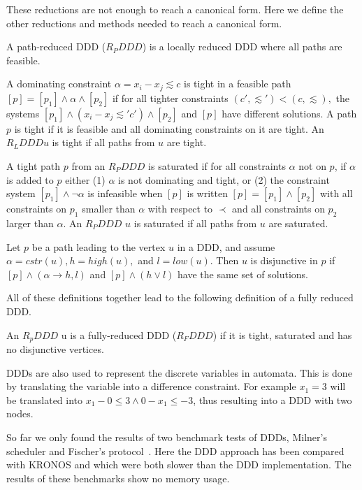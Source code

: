 These reductions are not enough to reach a canonical form. Here we define the other reductions and methods needed to reach a canonical form.

\begin{mydef}
A path-reduced DDD ($R_PDDD$) is a locally reduced DDD where all paths are feasible.
\end{mydef}

\begin{mydef}
A dominating constraint $\alpha = x_i - x_j \lesssim c$ is tight in a feasible path $[p] = [p_1] \wedge \alpha \wedge [p_2]$ if for all tighter constraints $(c', \lesssim') < (c,\lesssim),$ the systems $[p_1] \wedge (x_i - x_j \lesssim' c') \wedge [p_2]$ and $[p]$ have different solutions. A path $p$ is tight if it is feasible and all dominating constraints on it are tight. An $R_LDDD u$ is tight if all paths from $u$ are tight. 
\end{mydef}

\begin{mydef}
A tight path $p$ from an $R_PDDD$ is saturated if for all constraints $\alpha$ not on $p$, if $\alpha$ is added to $p$ either (1) $\alpha$ is not dominating and tight, or (2) the constraint system $[p_1] \wedge \neg\alpha$ is infeasible when $[p]$ is written $[p] = [p_1] \wedge [p_2]$ with all constraints on $p_1$ smaller than $\alpha$ with respect to $\prec$ and all constraints on $p_2$ larger than $\alpha$. An $R_PDDD$ $u$ is saturated if all paths from $u$ are saturated.
\end{mydef}

\begin{mydef}
Let $p$ be a path leading to the vertex $u$ in a DDD, and assume $\alpha = cstr(u), h = high(u),$ and $l = low(u)$. Then $u$ is disjunctive in $p$ if $[p] \wedge (\alpha \rightarrow h,l)$ and $[p] \wedge (h \vee l)$ have the same set of solutions.
\end{mydef}

All of these definitions together lead to the following definition of a fully reduced DDD.
% 
\begin{mydef}
\label{def:RFDDD}
An $R_pDDD$ u is a fully-reduced DDD ($R_FDDD$) if it is tight, saturated and has no disjunctive vertices.
\end{mydef}

DDDs are also used to represent the discrete variables in automata. This is done by translating the variable into a difference constraint. For example $x_1 = 3$ will be translated into $x_1 - 0 \leq 3 \wedge 0 - x_1 \leq -3$, thus resulting into a DDD with two nodes. 

So far we only found the results of two benchmark tests of DDDs, Milner's scheduler and Fischer's protocol~\cite{Møller200253}. Here the DDD approach has been compared with KRONOS and \uppaal{} which were both slower than the DDD implementation. The results of these benchmarks show no memory usage.  